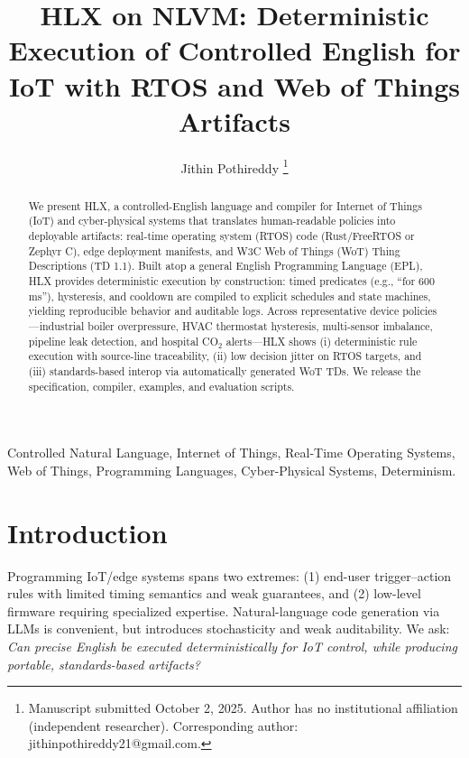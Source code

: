 \documentclass[journal]{IEEEtran}
\begin{document}
\title{HLX on NLVM: Deterministic Execution of Controlled English for IoT with RTOS and Web of Things Artifacts}

\author{Jithin Pothireddy%
\thanks{Manuscript submitted October 2, 2025. Author has no institutional affiliation (independent researcher). Corresponding author: jithinpothireddy21@gmail.com.}}

\maketitle

\begin{abstract}
We present HLX, a controlled-English language and compiler for Internet of Things (IoT) and cyber-physical systems that translates human-readable policies into deployable artifacts: real-time operating system (RTOS) code (Rust/FreeRTOS or Zephyr C), edge deployment manifests, and W3C Web of Things (WoT) Thing Descriptions (TD 1.1). Built atop a general English Programming Language (EPL), HLX provides deterministic execution by construction: timed predicates (e.g., “for 600\,ms”), hysteresis, and cooldown are compiled to explicit schedules and state machines, yielding reproducible behavior and auditable logs. Across representative device policies—industrial boiler overpressure, HVAC thermostat hysteresis, multi-sensor imbalance, pipeline leak detection, and hospital CO$_2$ alerts—HLX shows (i) deterministic rule execution with source-line traceability, (ii) low decision jitter on RTOS targets, and (iii) standards-based interop via automatically generated WoT TDs. We release the specification, compiler, examples, and evaluation scripts.
\end{abstract}

\begin{IEEEkeywords}
Controlled Natural Language, Internet of Things, Real-Time Operating Systems, Web of Things, Programming Languages, Cyber-Physical Systems, Determinism.
\end{IEEEkeywords}

\section{Introduction}
Programming IoT/edge systems spans two extremes: (1) end-user trigger–action rules with limited timing semantics and weak guarantees, and (2) low-level firmware requiring specialized expertise. Natural-language code generation via LLMs is convenient, but introduces stochasticity and weak auditability. We ask: \emph{Can precise English be executed deterministically for IoT control, while producing portable, standards-based artifacts?}
\end{document}
